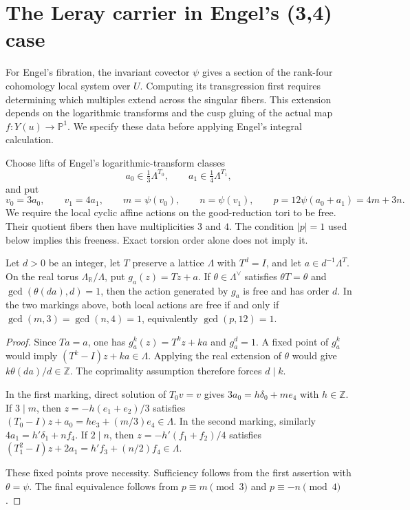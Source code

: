 \documentclass[11pt]{article}
\numberwithin{equation}{section}
\begin{document}
\section{The Leray carrier in Engel's (3,4) case}

For Engel's fibration, the invariant covector $\psi$ gives a section of
the rank-four cohomology local system over $U$.
Computing its transgression first requires determining which multiples
extend across the singular fibers. This extension depends on the
logarithmic transforms and the cusp gluing of the actual map
$f:Y(u)\to\mathbb P^1$.
We specify these data before applying Engel's integral calculation.

Choose lifts of Engel's logarithmic-transform classes
\[
 a_0\in\tfrac13\Lambda^{T_0},\qquad
 a_1\in\tfrac14\Lambda^{T_1},
\]
and put
\[
 v_0=3a_0,\qquad v_1=4a_1,\qquad
 m=\psi(v_0),\qquad n=\psi(v_1),\qquad
 p=12\psi(a_0+a_1)=4m+3n.                                        \tag{5.1}
\]
We require the local cyclic affine actions on the good-reduction tori to
be free.  Their quotient fibers then have multiplicities $3$ and $4$.
The condition $|p|=1$ used below implies this freeness.  Exact torsion
order alone does not imply it.

\begin{proposition}\label{prop:affine-free}
Let $d>0$ be an integer, let $T$ preserve a lattice $\Lambda$ with
$T^d=I$, and let
$a\in d^{-1}\Lambda^T$.  On the real torus
$\Lambda_{\mathbb R}/\Lambda$, put $g_a(z)=Tz+a$.
If $\theta\in\Lambda^\vee$ satisfies $\theta T=\theta$ and
$\gcd(\theta(da),d)=1$, then the action generated by $g_a$ is free
and has order $d$.  In the two markings above, both local actions are
free if and only if $\gcd(m,3)=\gcd(n,4)=1$, equivalently
$\gcd(p,12)=1$.
\end{proposition}

\begin{proof}
Since $Ta=a$, one has $g_a^k(z)=T^kz+ka$ and $g_a^d=1$.
A fixed point of $g_a^k$ would imply
$(T^k-I)z+ka\in\Lambda$.  Applying the real extension of $\theta$
would give $k\theta(da)/d\in\mathbb Z$.  The coprimality assumption
therefore forces $d\mid k$.

In the first marking, direct solution of $T_0v=v$ gives
$3a_0=h\delta_0+me_4$ with $h\in\mathbb Z$.
If $3\mid m$, then $z=-h(e_1+e_2)/3$ satisfies
$(T_0-I)z+a_0=he_3+(m/3)e_4\in\Lambda$.
In the second marking, similarly $4a_1=h'\delta_1+nf_4$.
If $2\mid n$, then $z=-h'(f_1+f_2)/4$ satisfies
$(T_1^2-I)z+2a_1=h'f_3+(n/2)f_4\in\Lambda$.

These fixed points prove necessity.  Sufficiency follows from the
first assertion with $\theta=\psi$.  The final equivalence follows
from $p\equiv m\pmod3$ and $p\equiv-n\pmod4$.
\end{proof}
\end{document}
